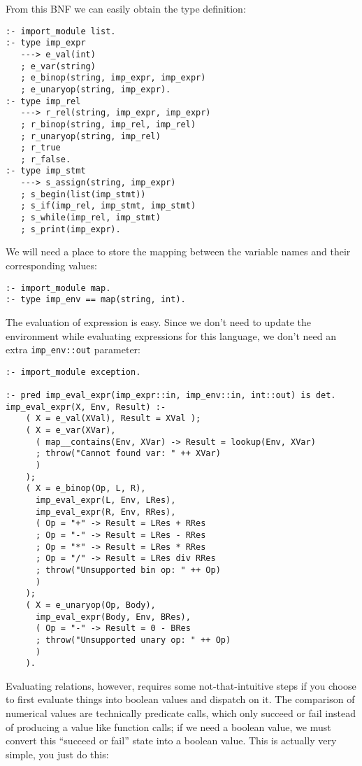 From this BNF we can easily obtain the type definition:

\begin{lstlisting}[language=Mercury]
:- import_module list.
:- type imp_expr
   ---> e_val(int)
   ; e_var(string)
   ; e_binop(string, imp_expr, imp_expr)
   ; e_unaryop(string, imp_expr).
:- type imp_rel
   ---> r_rel(string, imp_expr, imp_expr)
   ; r_binop(string, imp_rel, imp_rel)
   ; r_unaryop(string, imp_rel)
   ; r_true
   ; r_false.
:- type imp_stmt
   ---> s_assign(string, imp_expr)
   ; s_begin(list(imp_stmt))
   ; s_if(imp_rel, imp_stmt, imp_stmt)
   ; s_while(imp_rel, imp_stmt)
   ; s_print(imp_expr).
\end{lstlisting}

We will need a place to store the mapping between the variable names and their corresponding values:

\begin{lstlisting}[language=Mercury]
:- import_module map.
:- type imp_env == map(string, int).
\end{lstlisting}

The evaluation of expression is easy. Since we don't need to update the environment while evaluating expressions for this language, we don't need an extra \texttt{imp_env::out} parameter:

\begin{lstlisting}[language=Mercury]
% needed by `throw`
:- import_module exception.

:- pred imp_eval_expr(imp_expr::in, imp_env::in, int::out) is det.
imp_eval_expr(X, Env, Result) :-
	( X = e_val(XVal), Result = XVal );
	( X = e_var(XVar),
	  ( map__contains(Env, XVar) -> Result = lookup(Env, XVar)
	  ; throw("Cannot found var: " ++ XVar)
	  )
	);
	( X = e_binop(Op, L, R),
	  imp_eval_expr(L, Env, LRes),
	  imp_eval_expr(R, Env, RRes),
	  ( Op = "+" -> Result = LRes + RRes
	  ; Op = "-" -> Result = LRes - RRes
	  ; Op = "*" -> Result = LRes * RRes
	  ; Op = "/" -> Result = LRes div RRes
	  ; throw("Unsupported bin op: " ++ Op)
	  )
	);
	( X = e_unaryop(Op, Body),
	  imp_eval_expr(Body, Env, BRes),
	  ( Op = "-" -> Result = 0 - BRes
	  ; throw("Unsupported unary op: " ++ Op)
	  )
	).
\end{lstlisting}

Evaluating relations, however, requires some not-that-intuitive steps if you choose to first evaluate things into boolean values and dispatch on it. The comparison of numerical values are technically predicate calls, which only succeed or fail instead of producing a value like function calls; if we need a boolean value, we must convert this ``succeed or fail'' state into a boolean value. This is actually very simple, you just do this:

